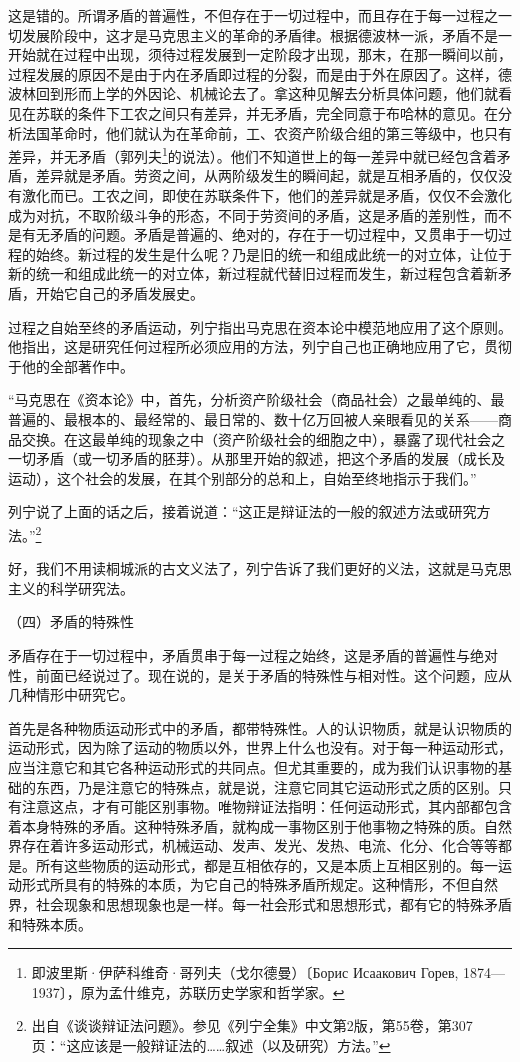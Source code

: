 \documentclass[UTF8, 12pt, a4paper]{ctexrep}
\begin{document}
这是错的。所谓矛盾的普遍性，不但存在于一切过程中，而且存在于每一过程之一切发展阶段中，这才是马克思主义的革命的矛盾律。根据德波林一派，矛盾不是一开始就在过程中出现，须待过程发展到一定阶段才出现，那末，在那一瞬间以前，过程发展的原因不是由于内在矛盾即过程的分裂，而是由于外在原因了。这样，德波林回到形而上学的外因论、机械论去了。拿这种见解去分析具体问题，他们就看见在苏联的条件下工农之间只有差异，并无矛盾，完全同意于布哈林的意见。在分析法国革命时，他们就认为在革命前，工、农资产阶级合组的第三等级中，也只有差异，并无矛盾（郭列夫\footnote{即波里斯·伊萨科维奇·哥列夫（戈尔德曼）〔Борис Исаакович Горев, 1874—1937〕，原为孟什维克，苏联历史学家和哲学家。}的说法）。他们不知道世上的每一差异中就已经包含着矛盾，差异就是矛盾。劳资之间，从两阶级发生的瞬间起，就是互相矛盾的，仅仅没有激化而已。工农之间，即使在苏联条件下，他们的差异就是矛盾，仅仅不会激化成为对抗，不取阶级斗争的形态，不同于劳资间的矛盾，这是矛盾的差别性，而不是有无矛盾的问题。矛盾是普遍的、绝对的，存在于一切过程中，又贯串于一切过程的始终。新过程的发生是什么呢？乃是旧的统一和组成此统一的对立体，让位于新的统一和组成此统一的对立体，新过程就代替旧过程而发生，新过程包含着新矛盾，开始它自己的矛盾发展史。

过程之自始至终的矛盾运动，列宁指出马克思在资本论中模范地应用了这个原则。他指出，这是研究任何过程所必须应用的方法，列宁自己也正确地应用了它，贯彻于他的全部著作中。

“马克思在《资本论》中，首先，分析资产阶级社会（商品社会）之最单纯的、最普遍的、最根本的、最经常的、最日常的、数十亿万回被人亲眼看见的关系——商品交换。在这最单纯的现象之中（资产阶级社会的细胞之中），暴露了现代社会之一切矛盾（或一切矛盾的胚芽）。从那里开始的叙述，把这个矛盾的发展（成长及运动），这个社会的发展，在其个别部分的总和上，自始至终地指示于我们。”

列宁说了上面的话之后，接着说道：“这正是辩证法的一般的叙述方法或研究方法。”\footnote{出自《谈谈辩证法问题》。参见《列宁全集》中文第2版，第55卷，第307页：“这应该是一般辩证法的……叙述（以及研究）方法。”}

好，我们不用读桐城派的古文义法了，列宁告诉了我们更好的义法，这就是马克思主义的科学研究法。

（四）矛盾的特殊性

矛盾存在于一切过程中，矛盾贯串于每一过程之始终，这是矛盾的普遍性与绝对性，前面已经说过了。现在说的，是关于矛盾的特殊性与相对性。这个问题，应从几种情形中研究它。

首先是各种物质运动形式中的矛盾，都带特殊性。人的认识物质，就是认识物质的运动形式，因为除了运动的物质以外，世界上什么也没有。对于每一种运动形式，应当注意它和其它各种运动形式的共同点。但尤其重要的，成为我们认识事物的基础的东西，乃是注意它的特殊点，就是说，注意它同其它运动形式之质的区别。只有注意这点，才有可能区别事物。唯物辩证法指明：任何运动形式，其内部都包含着本身特殊的矛盾。这种特殊矛盾，就构成一事物区别于他事物之特殊的质。自然界存在着许多运动形式，机械运动、发声、发光、发热、电流、化分、化合等等都是。所有这些物质的运动形式，都是互相依存的，又是本质上互相区别的。每一运动形式所具有的特殊的本质，为它自己的特殊矛盾所规定。这种情形，不但自然界，社会现象和思想现象也是一样。每一社会形式和思想形式，都有它的特殊矛盾和特殊本质。
\end{document}
